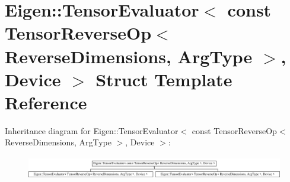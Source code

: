\hypertarget{struct_eigen_1_1_tensor_evaluator_3_01const_01_tensor_reverse_op_3_01_reverse_dimensions_00_01_arg_type_01_4_00_01_device_01_4}{}\section{Eigen\+:\+:Tensor\+Evaluator$<$ const Tensor\+Reverse\+Op$<$ Reverse\+Dimensions, Arg\+Type $>$, Device $>$ Struct Template Reference}
\label{struct_eigen_1_1_tensor_evaluator_3_01const_01_tensor_reverse_op_3_01_reverse_dimensions_00_01_arg_type_01_4_00_01_device_01_4}
Inheritance diagram for Eigen\+:\+:Tensor\+Evaluator$<$ const Tensor\+Reverse\+Op$<$ Reverse\+Dimensions, Arg\+Type $>$, Device $>$\+:\begin{figure}[H]
\begin{center}
\leavevmode
\includegraphics[height=1.009009cm]{struct_eigen_1_1_tensor_evaluator_3_01const_01_tensor_reverse_op_3_01_reverse_dimensions_00_01_arg_type_01_4_00_01_device_01_4}
\end{center}
\end{figure}
